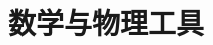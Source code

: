 \documentclass[UTF8,zihao=-4,oneside,openany]{ctexbook}
\begin{document}
\chapter{数学与物理工具}






\end{document}
